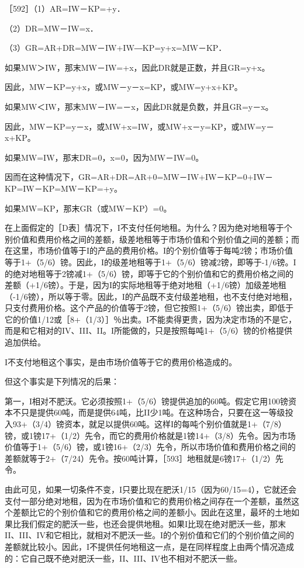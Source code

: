 ［592］（1）AR=IW－KP=+y．

（2）DR=MW－IW=x．

（3）GR=AR+DR=MW－IW+IW―KP=y+x=MW－KP．

如果MW＞IW，那末MW－IW=+x，因此DR就是正数，并且GR=y+x。

因此，MW－KP=y+x，或MW－y－x=KP，或MW=y+x+KP。

如果MW＜IW，那末MW－IW=－x，因此DR就是负数，并且GR=y－x。

因此，MW－KP=y－x，或MW+x=IW，或MW+x－y=KP，或MW=y－x+KP。

如果MW=IW，那末DR=0，x=0，因为MW－IW=0。

因而在这种情况下，GR=AR+DR=AR+0=MW－IW+IW－KP=0+IW－KP=IW－KP=MW－KP=+y。

如果MW=KP，那末GR（或MW－KP）=0。

在上面假定的［D表］情况下，I不支付任何地租。为什么？因为绝对地租等于个别价值和费用价格之间的差额，级差地租等于市场价值和个别价值之间的差额；而在这里，市场价值等于I的产品的费用价格。I的个别价值等于每吨2镑；市场价值等于1+（5/6）镑。因此，I的级差地租等于1+（5/6）镑减2镑，即等于-1/6镑。I的绝对地租等于2镑减1+（5/6）镑，即等于它的个别价值和它的费用价格之间的差额（+1/6镑）。于是，因为I的实际地租等于绝对地租（+1/6镑）加级差地租（-1/6镑），所以等于零。因此，I的产品既不支付级差地租，也不支付绝对地租，只支付费用价格。这个产品的价值等于2镑，但它按照1+（5/6）镑出卖，即低于它的价值1/12或［8+（1/3）］％出卖。I不能卖得更贵，因为决定市场的不是它，而是和它相对的IV、III、II。I所能做的，只是按照每吨1+（5/6）镑的价格提供追加供给。

I不支付地租这个事实，是由市场价值等于它的费用价格造成的。

但这个事实是下列情况的后果：

第一，I相对不肥沃。它必须按照1+（5/6）镑提供追加的60吨。假定它用100镑资本不只是提供60吨，而是提供64吨，比II少1吨。在这种场合，只要在这一等级投入93+（3/4）镑资本，就足以提供60吨。这样I的每吨个别价值就是1+（7/8）镑，或1镑17+（1/2）先令，而它的费用价格就是1镑14+（3/8）先令。因为市场价值等于1+（5/6）镑，或1镑16+（2/3）先令，所以市场价值和费用价格之间的差额就等于2+（7/24）先令。按60吨计算，［593］地租就是6镑17+（1/2）先令。

由此可见，如果一切条件不变，I只要比现在肥沃1/15（因为60/15=4），它就还会支付一部分绝对地租，因为在市场价值和它的费用价格之间存在一个差额，虽然这个差额比它的个别价值和它的费用价格之间的差额小。因此在这里，最坏的土地如果比我们假定的肥沃一些，也还会提供地租。如果I比现在绝对肥沃一些，那末II、III、IV和它相比，就相对不肥沃一些。I的个别价值和它们的个别价值之间的差额就比较小。因此，I不提供任何地租这一点，是在同样程度上由两个情况造成的：它自己既不绝对肥沃一些，II、III、IV也不相对不肥沃一些。

